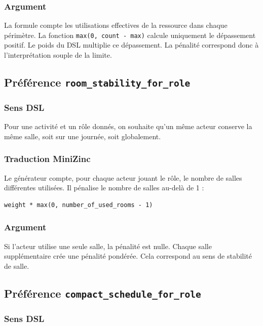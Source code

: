 \documentclass[12pt,a4paper]{article}
\begin{document}
\subsubsection*{Argument}

La formule compte les utilisations effectives de la ressource dans chaque périmètre. La fonction \texttt{max(0, count - max)} calcule uniquement le dépassement positif. Le poids du DSL multiplie ce dépassement. La pénalité correspond donc à l'interprétation souple de la limite.

\subsection{Préférence \texttt{room\_stability\_for\_role}}

\subsubsection*{Sens DSL}

Pour une activité et un rôle donnés, on souhaite qu'un même acteur conserve la même salle, soit sur une journée, soit globalement.

\subsubsection*{Traduction MiniZinc}

Le générateur compte, pour chaque acteur jouant le rôle, le nombre de salles différentes utilisées. Il pénalise le nombre de salles au-delà de 1 :

\begin{lstlisting}[language=MiniZinc]
weight * max(0, number_of_used_rooms - 1)
\end{lstlisting}

\subsubsection*{Argument}

Si l'acteur utilise une seule salle, la pénalité est nulle. Chaque salle supplémentaire crée une pénalité pondérée. Cela correspond au sens de stabilité de salle.

\subsection{Préférence \texttt{compact\_schedule\_for\_role}}

\subsubsection*{Sens DSL}
\end{document}
